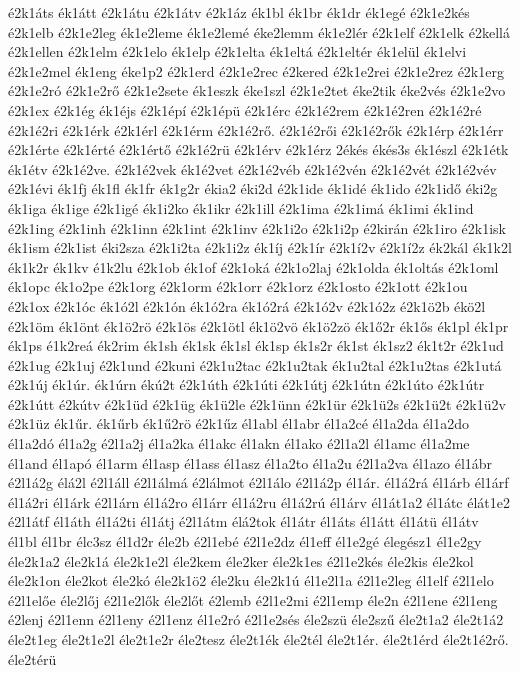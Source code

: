 {é2k1áts
ék1átt
é2k1átu
é2k1átv
é2k1áz
ék1bl
ék1br
ék1dr
ék1egé
é2k1e2kés
é2k1elb
é2k1e2leg
ék1e2leme
ék1e2lemé
éke2lemm
ék1e2lér
é2k1elf
é2k1elk
é2kellá
é2k1ellen
é2k1elm
é2k1elo
ék1elp
é2k1elta
ék1eltá
é2k1eltér
ék1elül
ék1elvi
é2k1e2mel
ék1eng
éke1p2
é2k1erd
é2k1e2rec
é2kered
é2k1e2rei
é2k1e2rez
é2k1erg
é2k1e2ró
é2k1e2rő
é2k1e2sete
ék1eszk
éke1szl
é2k1e2tet
éke2tik
éke2vés
é2k1e2vo
é2k1ex
é2k1ég
ék1éjs
é2k1épí
é2k1épü
é2k1érc
é2k1é2rem
é2k1é2ren
é2k1é2ré
é2k1é2ri
é2k1érk
é2k1érl
é2k1érm
é2k1é2rő.
é2k1é2rői
é2k1é2rők
é2k1érp
é2k1érr
é2k1érte
é2k1érté
é2k1értő
é2k1é2rü
é2k1érv
é2k1érz
2ékés
ékés3s
ék1észl
é2k1étk
ék1étv
é2k1é2ve.
é2k1é2vek
ék1é2vet
é2k1é2véb
é2k1é2vén
é2k1é2vét
é2k1é2vév
é2k1évi
ék1fj
ék1fl
ék1fr
ék1g2r
ékia2
éki2d
é2k1ide
ék1idé
ék1ido
é2k1idő
éki2g
ék1iga
ék1ige
é2k1igé
ék1i2ko
ék1ikr
é2k1ill
é2k1ima
é2k1imá
ék1imi
ék1ind
é2k1ing
é2k1inh
é2k1inn
é2k1int
é2k1inv
é2k1i2o
é2k1i2p
é2kirán
é2k1iro
é2k1isk
ék1ism
é2k1ist
éki2sza
é2k1i2ta
é2k1i2z
ék1íj
é2k1ír
é2k1í2v
é2k1í2z
ék2kál
ék1k2l
ék1k2r
ék1kv
é1k2lu
é2k1ob
ék1of
é2k1oká
é2k1o2laj
é2k1olda
ék1oltás
é2k1oml
ék1opc
ék1o2pe
é2k1org
é2k1orm
é2k1orr
é2k1orz
é2k1osto
é2k1ott
é2k1ou
é2k1ox
é2k1óc
ék1ó2l
é2k1ón
ék1ó2ra
ék1ó2rá
é2k1ó2v
é2k1ó2z
é2k1ö2b
ékö2l
é2k1öm
ék1önt
ék1ö2rö
é2k1ös
é2k1ötl
ék1ö2vö
ék1ö2zö
ék1ő2r
ék1ős
ék1pl
ék1pr
ék1ps
é1k2reá
ék2rim
ék1sh
ék1sk
ék1sl
ék1sp
ék1s2r
ék1st
ék1sz2
ék1t2r
é2k1ud
é2k1ug
é2k1uj
é2k1und
é2kuni
é2k1u2tac
é2k1u2tak
ék1u2tal
é2k1u2tas
é2k1utá
é2k1új
ék1úr.
ék1úrn
ékú2t
é2k1úth
é2k1úti
é2k1útj
é2k1útn
é2k1úto
é2k1útr
é2k1útt
é2kútv
é2k1üd
é2k1üg
ék1ü2le
é2k1ünn
é2k1ür
é2k1ü2s
é2k1ü2t
é2k1ü2v
é2k1üz
ék1űr.
ék1űrb
ék1ű2rö
é2k1űz
él1abl
él1abr
él1a2cé
él1a2da
él1a2do
él1a2dó
él1a2g
é2l1a2j
él1a2ka
él1akc
él1akn
él1ako
é2l1a2l
él1amc
él1a2me
él1and
él1apó
él1arm
él1asp
él1ass
él1asz
él1a2to
él1a2u
é2l1a2va
él1azo
él1ábr
é2l1á2g
élá2l
é2l1áll
é2l1álmá
é2lálmot
é2l1álo
é2l1á2p
él1ár.
él1á2rá
él1árb
él1árf
él1á2ri
él1árk
é2l1árn
él1á2ro
él1árr
él1á2ru
él1á2rú
él1árv
él1át1a2
él1átc
élát1e2
é2l1átf
él1áth
él1á2ti
él1átj
é2l1átm
élá2tok
él1átr
él1áts
él1átt
él1átü
él1átv
él1bl
él1br
élc3sz
él1d2r
éle2b
é2l1ebé
é2l1e2dz
él1eff
él1e2gé
élegész1
él1e2gy
éle2k1a2
éle2k1á
éle2k1e2l
éle2kem
éle2ker
éle2k1es
é2l1e2kés
éle2kis
éle2kol
éle2k1on
éle2kot
éle2kó
éle2k1ö2
éle2ku
éle2k1ú
él1e2l1a
é2l1e2leg
él1elf
é2l1elo
é2l1előe
éle2lőj
é2l1e2lők
éle2lőt
é2lemb
é2l1e2mi
é2l1emp
éle2n
é2l1ene
é2l1eng
é2lenj
é2l1enn
é2l1eny
é2l1enz
él1e2ró
é2l1e2sés
éle2szü
éle2szű
éle2t1a2
éle2t1á2
éle2t1eg
éle2t1e2l
éle2t1e2r
éle2tesz
éle2t1ék
éle2tél
éle2t1ér.
éle2t1érd
éle2t1é2rő.
éle2térü
}
